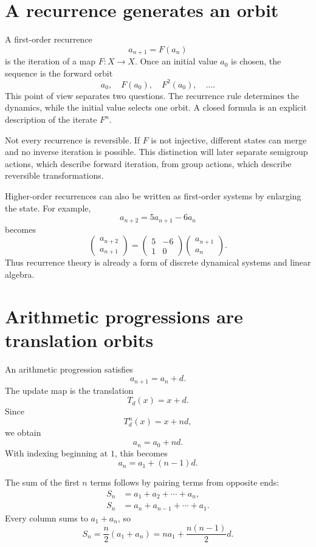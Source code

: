 
\section{A recurrence generates an orbit}

A first-order recurrence
\[
  a_{n+1}=F(a_n)
\]
is the iteration of a map \(F:X\to X\).  Once an initial value \(a_0\) is chosen, the sequence is the forward orbit
\[
  a_0,
  \quad F(a_0),
  \quad F^2(a_0),
  \quad \ldots.
\]
This point of view separates two questions.  The recurrence rule determines the dynamics, while the initial value selects one orbit.  A closed formula is an explicit description of the iterate \(F^n\).

Not every recurrence is reversible.  If \(F\) is not injective, different states can merge and no inverse iteration is possible.  This distinction will later separate semigroup actions, which describe forward iteration, from group actions, which describe reversible transformations.

Higher-order recurrences can also be written as first-order systems by enlarging the state.  For example,
\[
  a_{n+2}=5a_{n+1}-6a_n
\]
becomes
\[
  \begin{pmatrix}a_{n+2}\\a_{n+1}\end{pmatrix}
  =
  \begin{pmatrix}5&-6\\1&0\end{pmatrix}
  \begin{pmatrix}a_{n+1}\\a_n\end{pmatrix}.
\]
Thus recurrence theory is already a form of discrete dynamical systems and linear algebra.

\section{Arithmetic progressions are translation orbits}

An arithmetic progression satisfies
\[
  a_{n+1}=a_n+d.
\]
The update map is the translation
\[
  T_d(x)=x+d.
\]
Since
\[
  T_d^n(x)=x+nd,
\]
we obtain
\[
  \boxed{a_n=a_0+nd.}
\]
With indexing beginning at \(1\), this becomes
\[
  a_n=a_1+(n-1)d.
\]

The sum of the first \(n\) terms follows by pairing terms from opposite ends:
\[
\begin{aligned}
S_n
&=a_1+a_2+\cdots+a_n,\\
S_n
&=a_n+a_{n-1}+\cdots+a_1.
\end{aligned}
\]
Every column sums to \(a_1+a_n\), so
\[
  \boxed{S_n=\frac n2(a_1+a_n)
  =na_1+\frac{n(n-1)}2d.}
\]

